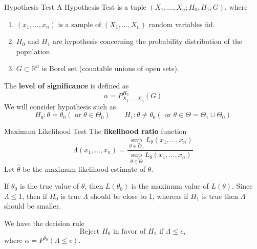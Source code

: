 \documentclass{beamer}
\begin{document}
\begin{frame}{Hypothesis Test}
	A Hypothesis Test is a tuple $(X_1,\ldots, X_n; H_0,H_1,G)$, where
	\begin{enumerate}
		\item $(x_1,\ldots, x_n)$ is a sample of $(X_1,\ldots, X_n)$ random variables iid.
		\item $H_0$ and $H_1$ are hypothesis concerning the probability distribution of the population.
		\item $G\subset \mathbb{R}^n$ is Borel set (countable unions of open sets). 
	\end{enumerate}
The \textbf{level of significance} is defined as 
\begin{equation*}
	\alpha = P^{H_0}_{X_1,\ldots, X_n}(G)
\end{equation*}
We will consider hypothesis such as
\begin{equation*}
	H_0\colon \theta=\theta_0 (\text{ or }\theta \in \Theta_0) \qquad H_1 \colon \theta\ne \theta_0 (\text{ or }\theta \in \Theta=\Theta_1\cup \Theta_0)
\end{equation*}

\end{frame}

\begin{frame}{Maximum Likelihood Test}
	The \textbf{likelihood ratio} function
	\begin{equation*}
		\Lambda(x_1,\ldots,x_n)= \frac{\sup_{\theta\in \Theta_0}L_\theta(x_1,\ldots,x_n)}{\sup_{\theta\in \Theta} L_\theta(x_1,\ldots, x_n)}
	\end{equation*}
Let $\widehat{\theta}$ be the maximum likelihood estimate of $\theta$. 

If $\theta_0$ is the true value of $\theta$, then $L(\theta_0)$ is the maximum value of $L(\theta)$. Since $\Lambda \le 1$, then if $H_0$ is true $\Lambda $ should be close to 1, whereas if $H_1$ is true then $\Lambda$ should be smaller. 

We have the decision rule
\begin{equation*}
	\text{Reject } H_0 \text{ in favor of } H_1 \text{ if }\Lambda \le c,
\end{equation*}
where $\alpha= P^{\theta_0}(\Lambda \le c)$.
\end{frame}
\end{document}
